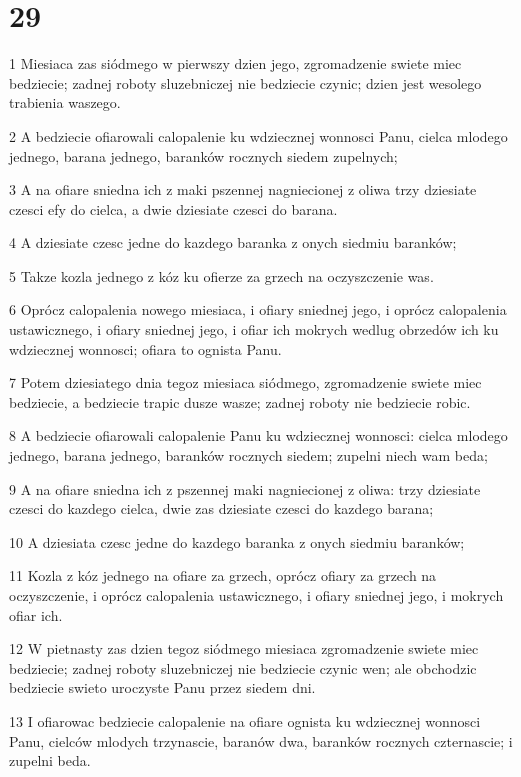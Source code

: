 \chapter{29}

\par 1 Miesiaca zas siódmego w pierwszy dzien jego, zgromadzenie swiete miec bedziecie; zadnej roboty sluzebniczej nie bedziecie czynic; dzien jest wesolego trabienia waszego.
\par 2 A bedziecie ofiarowali calopalenie ku wdziecznej wonnosci Panu, cielca mlodego jednego, barana jednego, baranków rocznych siedem zupelnych;
\par 3 A na ofiare sniedna ich z maki pszennej nagniecionej z oliwa trzy dziesiate czesci efy do cielca, a dwie dziesiate czesci do barana.
\par 4 A dziesiate czesc jedne do kazdego baranka z onych siedmiu baranków;
\par 5 Takze kozla jednego z kóz ku ofierze za grzech na oczyszczenie was.
\par 6 Oprócz calopalenia nowego miesiaca, i ofiary sniednej jego, i oprócz calopalenia ustawicznego, i ofiary sniednej jego, i ofiar ich mokrych wedlug obrzedów ich ku wdziecznej wonnosci; ofiara to ognista Panu.
\par 7 Potem dziesiatego dnia tegoz miesiaca siódmego, zgromadzenie swiete miec bedziecie, a bedziecie trapic dusze wasze; zadnej roboty nie bedziecie robic.
\par 8 A bedziecie ofiarowali calopalenie Panu ku wdziecznej wonnosci: cielca mlodego jednego, barana jednego, baranków rocznych siedem; zupelni niech wam beda;
\par 9 A na ofiare sniedna ich z pszennej maki nagniecionej z oliwa: trzy dziesiate czesci do kazdego cielca, dwie zas dziesiate czesci do kazdego barana;
\par 10 A dziesiata czesc jedne do kazdego baranka z onych siedmiu baranków;
\par 11 Kozla z kóz jednego na ofiare za grzech, oprócz ofiary za grzech na oczyszczenie, i oprócz calopalenia ustawicznego, i ofiary sniednej jego, i mokrych ofiar ich.
\par 12 W pietnasty zas dzien tegoz siódmego miesiaca zgromadzenie swiete miec bedziecie; zadnej roboty sluzebniczej nie bedziecie czynic wen; ale obchodzic bedziecie swieto uroczyste Panu przez siedem dni.
\par 13 I ofiarowac bedziecie calopalenie na ofiare ognista ku wdziecznej wonnosci Panu, cielców mlodych trzynascie, baranów dwa, baranków rocznych czternascie; i zupelni beda.
